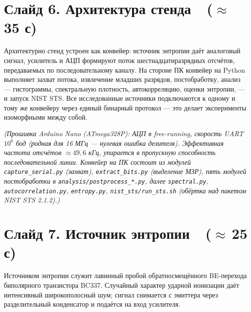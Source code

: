 \documentclass[12pt,a4paper]{extarticle}
\newcommand{\note}[1]{%
  \par
  {\small\color{noteclr}\itshape (#1)}%
  \par}
\begin{document}
\section*{Слайд 6. Архитектура стенда~~($\approx$\,35 с)}

Архитектурно стенд устроен как конвейер: источник энтропии даёт аналоговый
сигнал, усилитель и АЦП формируют поток шестнадцатиразрядных отсчётов,
передаваемых по последовательному каналу. На стороне ПК конвейер на Python
выполняет захват потока, извлечение младших разрядов, постобработку, анализ ---
гистограммы, спектральную плотность, автокорреляцию, оценки энтропии, ---
и запуск NIST STS. Все исследованные источники подключаются к одному и тому
же конвейеру через единый бинарный протокол --- это делает эксперименты
изоморфными между собой.

\note{Прошивка Arduino Nano (ATmega328P): АЦП в free-running, скорость UART
$10^6$ бод (родная для 16 МГц --- нулевая ошибка делителя). Эффективная
частота отсчётов $\approx 49{,}6$ кГц, упирается в пропускную способность
последовательной линии. Конвейер на ПК состоит из модулей
\texttt{capture\_serial.py} (захват), \texttt{extract\_bits.py} (выделение
МЗР), пять модулей постобработки в \texttt{analysis/postprocess\_*.py}, далее
\texttt{spectral.py}, \texttt{autocorrelation.py}, \texttt{entropy.py},
\texttt{nist\_sts/run\_sts.sh} (обёртка над пакетом NIST STS 2.1.2).}

\section*{Слайд 7. Источник энтропии~~($\approx$\,25 с)}

Источником энтропии служит лавинный пробой обратносмещённого BE-перехода
биполярного транзистора BC337. Случайный характер ударной ионизации даёт
интенсивный широкополосный шум; сигнал снимается с эмиттера через
разделительный конденсатор и подаётся на вход усилителя.
\end{document}
